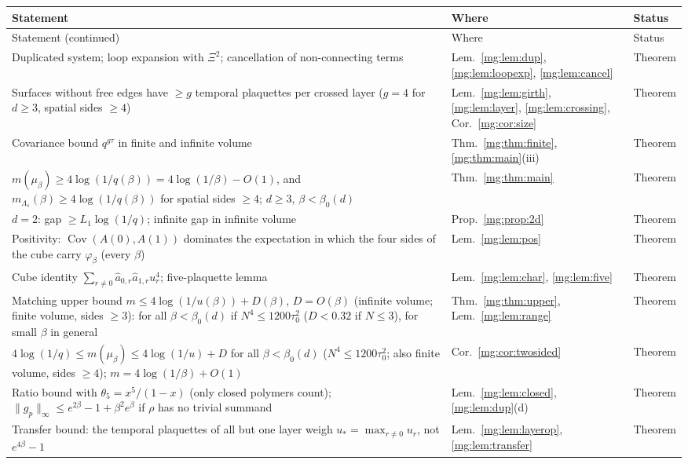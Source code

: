 \documentclass[11pt,a4paper]{article}
\theoremstyle{definition}
\theoremstyle{remark}
\DeclareMathOperator{\Cov}{Cov}
\newcommand{\norm}[1]{\lVert #1\rVert}
\begin{document}
\begingroup
\small
\begin{longtable}{@{}p{}p{}p{}@{}}
\toprule
Statement & Where & Status\\
\midrule
\endfirsthead
\toprule
Statement (continued) & Where & Status\\
\midrule
\endhead
\bottomrule
\endfoot
Duplicated system; loop expansion with $\Xi^2$; cancellation of non-connecting terms & Lem.~\ref{mg:lem:dup}, \ref{mg:lem:loopexp}, \ref{mg:lem:cancel} & Theorem\\
Surfaces without free edges have $\ge g$ temporal plaquettes per crossed layer ($g=4$ for $d\ge3$, spatial sides $\ge4$) & Lem.~\ref{mg:lem:girth}, \ref{mg:lem:layer}, \ref{mg:lem:crossing}, Cor.~\ref{mg:cor:size} & Theorem\\
Covariance bound $q^{g\tau}$ in finite and infinite volume & Thm.~\ref{mg:thm:finite}, \ref{mg:thm:main}(iii) & Theorem\\
$m(\mu_\beta)\ge4\log(1/q(\beta))=4\log(1/\beta)-O(1)$, and $m_{\Lambda_s}(\beta)\ge4\log(1/q(\beta))$ for spatial sides $\ge4$; $d\ge3$, $\beta<\beta_0(d)$ & Thm.~\ref{mg:thm:main} & Theorem\\
$d=2$: gap $\ge L_1\log(1/q)$; infinite gap in infinite volume & Prop.~\ref{mg:prop:2d} & Theorem\\
Positivity: $\Cov(A(0),A(1))$ dominates the expectation in which the four sides of the cube carry $\varphi_\beta$ (every $\beta$) & Lem.~\ref{mg:lem:pos} & Theorem\\
Cube identity $\sum_{r\ne0}\hat a_{0,r}\hat a_{1,r}u_r^4$; five-plaquette lemma & Lem.~\ref{mg:lem:char}, \ref{mg:lem:five} & Theorem\\
Matching upper bound $m\le4\log(1/u(\beta))+D(\beta)$, $D=O(\beta)$ (infinite volume; finite volume, sides $\ge3$): for all $\beta<\beta_0(d)$ if $N^4\le1200\tau_0^2$ ($D<0.32$ if $N\le3$), for small $\beta$ in general & Thm.~\ref{mg:thm:upper}, Lem.~\ref{mg:lem:range} & Theorem\\
$4\log(1/q)\le m(\mu_\beta)\le4\log(1/u)+D$ for all $\beta<\beta_0(d)$ ($N^4\le1200\tau_0^2$; also finite volume, sides $\ge4$); $m=4\log(1/\beta)+O(1)$ & Cor.~\ref{mg:cor:twosided} & Theorem\\
Ratio bound with $\theta_5=x^5/(1-x)$ (only closed polymers count); $\norm{g_p}_\infty\le e^{2\beta}-1+\beta^2e^\beta$ if $\rho$ has no trivial summand & Lem.~\ref{mg:lem:closed}, \ref{mg:lem:dup}(d) & Theorem\\
Transfer bound: the temporal plaquettes of all but one layer weigh $u_*=\max_{r\ne0}u_r$, not $e^{4\beta}-1$ & Lem.~\ref{mg:lem:layerop}, \ref{mg:lem:transfer} & Theorem\\

\end{longtable}
\end{document}
